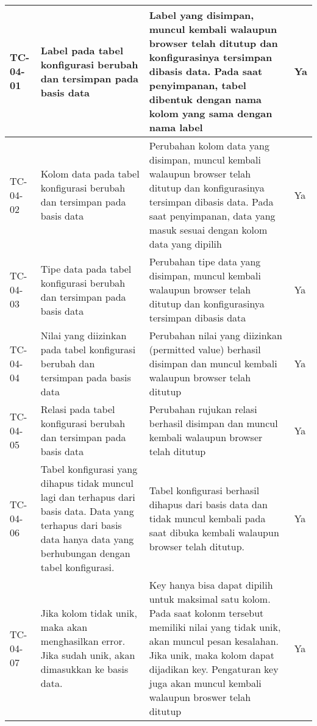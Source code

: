 \begin{small}
\begin{longtable}{ | p{2cm} | p{4cm} | p{4cm} | p{2cm} | }
	\\ \hline TC-04-01 & Label pada tabel konfigurasi berubah dan tersimpan pada basis data & Label yang disimpan, muncul kembali walaupun browser telah ditutup dan konfigurasinya tersimpan dibasis data. Pada saat penyimpanan, tabel dibentuk dengan nama kolom yang sama dengan nama label & Ya
	\\ \hline TC-04-02 & Kolom data pada tabel konfigurasi berubah dan tersimpan pada basis data & Perubahan kolom data yang disimpan, muncul kembali walaupun browser telah ditutup dan konfigurasinya tersimpan dibasis data. Pada saat penyimpanan, data yang masuk sesuai dengan kolom data yang dipilih & Ya
	\\ \hline TC-04-03 & Tipe data pada tabel konfigurasi berubah dan tersimpan pada basis data & Perubahan tipe data yang disimpan, muncul kembali walaupun browser telah ditutup dan konfigurasinya tersimpan dibasis data & Ya
	\\ \hline TC-04-04 & Nilai yang diizinkan pada tabel konfigurasi berubah dan tersimpan pada basis data & Perubahan nilai yang diizinkan (permitted value) berhasil disimpan dan muncul kembali walaupun browser telah ditutup & Ya
	\\ \hline TC-04-05 & Relasi pada tabel konfigurasi berubah dan tersimpan pada basis data & Perubahan rujukan relasi berhasil disimpan dan muncul kembali walaupun browser telah ditutup & Ya
	\\ \hline TC-04-06 & Tabel konfigurasi yang dihapus tidak muncul lagi dan terhapus dari basis data. Data yang terhapus dari basis data hanya data yang berhubungan dengan tabel konfigurasi. & Tabel konfigurasi berhasil dihapus dari basis data dan tidak muncul kembali pada saat dibuka kembali walaupun browser telah ditutup. & Ya
	\\ \hline TC-04-07 & Jika kolom tidak unik, maka akan menghasilkan error. Jika sudah unik, akan dimasukkan ke basis data. & Key hanya bisa dapat dipilih untuk maksimal satu kolom. Pada saat kolonm tersebut memiliki nilai yang tidak unik, akan muncul pesan kesalahan. Jika unik, maka kolom dapat dijadikan key. Pengaturan key juga akan muncul kembali walaupun broswer telah ditutup & Ya


\end{longtable}
\end{small}

